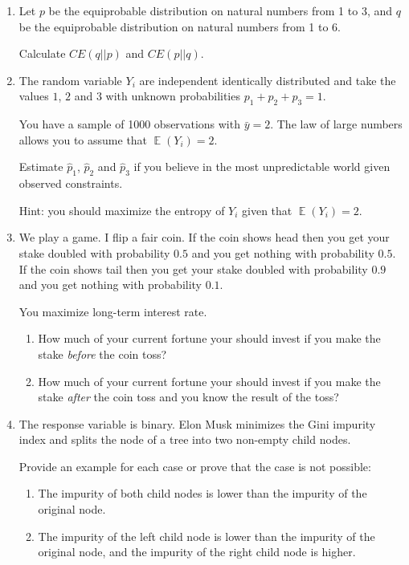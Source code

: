 \documentclass[12pt]{article}
\DeclareMathOperator{\E}{\mathbb{E}}
\begin{document}
\begin{enumerate}

\item Let $p$ be the equiprobable distribution on natural numbers from 1 to 3, 
and $q$ be the equiprobable distribution on natural numbers from 1 to 6.

Calculate $CE(q||p)$ and $CE(p||q)$.


\item The random variable $Y_i$ are independent identically distributed and take 
the values $1$, $2$ and $3$ with unknown probabilities $p_1 + p_2 + p_3 = 1$.

You have a sample of 1000 observations with $\bar y = 2$. 
The law of large numbers allows you to assume that $\E(Y_i) = 2$.

Estimate $\hat p_1$, $\hat p_2$ and $\hat p_3$ if you believe in the most unpredictable world given observed constraints. 

Hint: you should maximize the entropy of $Y_i$ given that $\E(Y_i) = 2$.


\item We play a game. 
I flip a fair coin. 
If the coin shows head then you get your stake doubled with probability $0.5$ and you get nothing with probability $0.5$.
If the coin shows tail then you get your stake doubled with probability $0.9$ and you get nothing with probability $0.1$.

You maximize long-term interest rate. 
\begin{enumerate}
    \item How much of your current fortune your should invest if you make the stake \textit{before} the coin toss?
    \item How much of your current fortune your should invest if you make the stake \textit{after} the coin toss 
    and you know the result of the toss?
\end{enumerate}


\item The response variable is binary. 
Elon Musk minimizes the Gini impurity index and splits the node of a tree 
into two non-empty child nodes.

Provide an example for each case or prove that the case is not possible: 
\begin{enumerate}
    \item The impurity of both child nodes is lower than the impurity of the original node. 
    \item The impurity of the left child node is lower than the impurity of the original node,
    and the impurity of the right child node is higher. 
\end{enumerate}



\end{enumerate}
\end{document}
